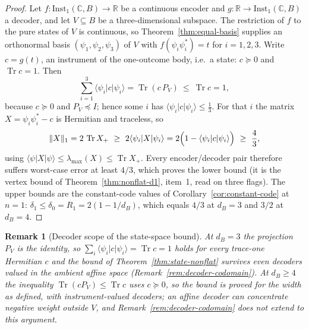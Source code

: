 \documentclass[11pt,a4paper]{article}
\newtheorem{remark}[theorem]{Remark}
\newcommand{\Inst}{\mathrm{Inst}}
\newcommand{\Tr}{\operatorname{Tr}}
\begin{document}
\begin{proof}
Let $f\colon\Inst_1(\mathbb C,B)\to\mathbb R$ be a continuous encoder and
$g\colon\mathbb R\to\Inst_1(\mathbb C,B)$ a decoder, and let $V\subseteq B$ be a
three-dimensional subspace. The restriction of $f$ to the pure states of $V$ is
continuous, so Theorem~\ref{thm:equal-basis} supplies an orthonormal basis
$(\psi_1,\psi_2,\psi_3)$ of $V$ with
$f(\psi_i\psi_i^*)=t$ for $i=1,2,3$. Write $c=g(t)$, an instrument of the
one-outcome body, i.e.\ a state: $c\succeq0$ and $\Tr c=1$. Then
\[
\sum_{i=1}^3\langle\psi_i|c|\psi_i\rangle
=\Tr(c\,P_V)\ \le\ \Tr c=1,
\]
because $c\succeq0$ and $P_V\preceq I$; hence some $i$ has
$\langle\psi_i|c|\psi_i\rangle\le\tfrac13$. For that $i$ the matrix
$X=\psi_i\psi_i^*-c$ is Hermitian and traceless, so
\[
\|X\|_1=2\,\Tr X_+\ \ge\ 2\langle\psi_i|X|\psi_i\rangle
=2\Bigl(1-\langle\psi_i|c|\psi_i\rangle\Bigr)\ \ge\ \frac43,
\]
using $\langle\psi|X|\psi\rangle\le\lambda_{\max}(X)\le\Tr X_+$. Every
encoder/decoder pair therefore suffers worst-case error at least $4/3$, which
proves the lower bound (it is the vertex bound of Theorem~\ref{thm:nonflat-d1},
item~1, read on three flags). The upper bounds are the constant-code values of
Corollary~\ref{cor:constant-code} at $n=1$:
$\delta_1\le\delta_0=R_1=2(1-1/d_B)$, which equals $4/3$ at $d_B=3$ and $3/2$ at
$d_B=4$.
\end{proof}

\begin{remark}[Decoder scope of the state-space bound]
\label{rem:affine-scope}
At $d_B=3$ the projection $P_V$ is the identity, so
$\sum_i\langle\psi_i|c|\psi_i\rangle=\Tr c=1$ holds for every trace-one
Hermitian $c$ and the bound of Theorem~\ref{thm:state-nonflat} survives even
decoders valued in the ambient affine space (Remark~\ref{rem:decoder-codomain}).
At $d_B\ge4$ the inequality $\Tr(cP_V)\le\Tr c$ uses $c\succeq0$, so the bound is
proved for the width as defined, with instrument-valued decoders; an affine
decoder can concentrate negative weight outside $V$, and
Remark~\ref{rem:decoder-codomain} does not extend to this argument. \end{remark}

\end{document}

